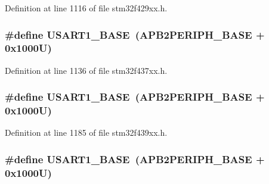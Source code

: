 Definition at line 1116 of file stm32f429xx.\+h.

\subsubsection[{\texorpdfstring{U\+S\+A\+R\+T1\+\_\+\+B\+A\+SE}{USART1_BASE}}]{\setlength{\rightskip}{0pt plus 5cm}\#define U\+S\+A\+R\+T1\+\_\+\+B\+A\+SE~({\bf A\+P\+B2\+P\+E\+R\+I\+P\+H\+\_\+\+B\+A\+SE} + 0x1000\+U)}\hypertarget{group___peripheral__memory__map_ga86162ab3f740db9026c1320d46938b4d}{}\label{group___peripheral__memory__map_ga86162ab3f740db9026c1320d46938b4d}


Definition at line 1136 of file stm32f437xx.\+h.

\subsubsection[{\texorpdfstring{U\+S\+A\+R\+T1\+\_\+\+B\+A\+SE}{USART1_BASE}}]{\setlength{\rightskip}{0pt plus 5cm}\#define U\+S\+A\+R\+T1\+\_\+\+B\+A\+SE~({\bf A\+P\+B2\+P\+E\+R\+I\+P\+H\+\_\+\+B\+A\+SE} + 0x1000\+U)}\hypertarget{group___peripheral__memory__map_ga86162ab3f740db9026c1320d46938b4d}{}\label{group___peripheral__memory__map_ga86162ab3f740db9026c1320d46938b4d}


Definition at line 1185 of file stm32f439xx.\+h.

\subsubsection[{\texorpdfstring{U\+S\+A\+R\+T1\+\_\+\+B\+A\+SE}{USART1_BASE}}]{\setlength{\rightskip}{0pt plus 5cm}\#define U\+S\+A\+R\+T1\+\_\+\+B\+A\+SE~({\bf A\+P\+B2\+P\+E\+R\+I\+P\+H\+\_\+\+B\+A\+SE} + 0x1000\+U)}\hypertarget{group___peripheral__memory__map_ga86162ab3f740db9026c1320d46938b4d}{}\label{group___peripheral__memory__map_ga86162ab3f740db9026c1320d46938b4d}


